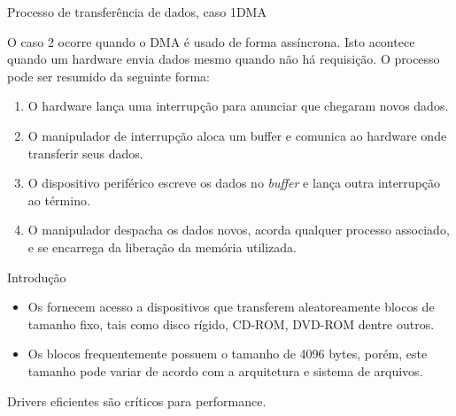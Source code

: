 \begin{frame}{Processo de transferência de dados, caso 1}{DMA}

  O caso 2 ocorre quando o DMA é usado de forma assíncrona. Isto acontece 
  quando um hardware envia dados mesmo quando não há requisição. O processo 
  pode ser resumido da seguinte forma:
  \begin{enumerate}
  \item<1> O hardware lança uma interrupção para anunciar que chegaram
    novos dados.
  \item<2-> O manipulador de interrupção aloca um buffer e comunica ao 
    hardware onde transferir seus dados.
  \item<3-> O dispositivo periférico escreve os dados no {\it buffer}
    e lança outra interrupção ao término.
  \item<4-> O manipulador despacha os dados novos, acorda qualquer processo 
    associado, e se encarrega da liberação da memória utilizada.
  \end{enumerate}

\end{frame}


\begin{frame}{\insertlecture}{Introdução}

  \begin{itemize}
  \item Os \alert{\insertlecture} fornecem acesso a dispositivos que
    transferem aleatoreamente blocos de tamanho fixo, tais como disco
    rígido, CD-ROM, DVD-ROM dentre outros.
  \item Os blocos frequentemente possuem o tamanho de \alert{4096
      bytes}, porém, este tamanho pode variar de acordo com a
    arquitetura e sistema de arquivos.
  \end{itemize}

  Drivers eficientes são críticos para performance.

\end{frame}


